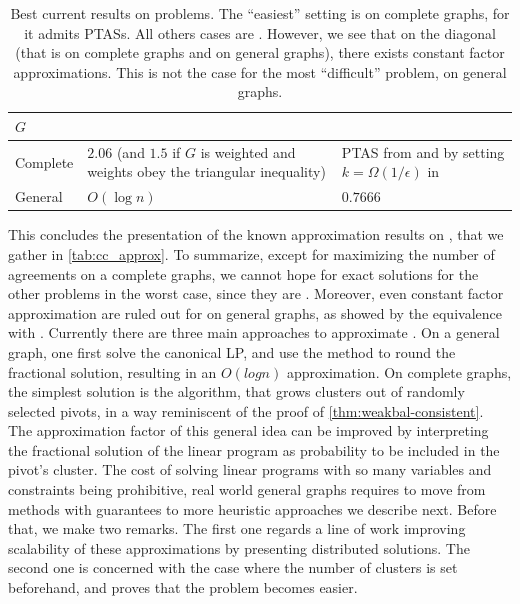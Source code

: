 \begin{table}
   \caption{Best current results on \pcc{} problems. The \enquote{easiest} setting is \maxa{} on
      complete graphs, for it admits PTASs. All others cases are \APXh{}. However, we see that on
      the diagonal (that is \mind{} on complete graphs and \maxa{} on general graphs), there exists
      constant factor approximations. This is not the case for the most \enquote{difficult} problem,
      \mind{} on general graphs. \label{tab:cc_approx}}
   \begin{tabulary}{\textwidth}{lLL}
      \toprule
      $G$      &  \mind{}                                                  & \maxa{}                                 \\
      \midrule
      Complete &  $2.06$ (and $1.5$ if $G$ is weighted and weights obey the triangular inequality) \autocite{Chawla2014}
               & PTAS from \textcite{Bansal2002} and by setting $k=\Omega(1/\epsilon)$ in \autocite{Giotis2006}      \\
      General  &  $O(\log n)$ \autocite{Charikar2003}                      & $0.7666$ \autocite{Swamy2004}           \\
      \bottomrule
   \end{tabulary}
\end{table}

\medskip

This concludes the presentation of the known approximation results on \pcc{}, that we gather in
\autoref{tab:cc_approx}.
To summarize, except for maximizing the number of agreements on a complete graphs, we cannot hope
for exact solutions for the other problems in the worst case, since they are \APXh{}. Moreover, even
constant factor approximation are ruled out for \mind{} on general graphs, as showed by the
equivalence with \mmc{}.
Currently there are three main approaches to approximate \mind{}. On a general graph,
one first solve the canonical LP, and use the \regionGrow{} method to round the fractional solution,
resulting in an $O(log n)$ approximation. On complete graphs, the simplest solution is the
\ccpivot{} algorithm, that grows clusters out of randomly selected pivots, in a way reminiscent of
the proof of \autoref{thm:weakbal-consistent}. The approximation factor of this general idea can be
improved by interpreting the fractional solution of the linear program as probability to be included
in the pivot's cluster. The cost of solving linear programs with so many variables and constraints
being prohibitive, real world general graphs requires to move from methods with guarantees to more
heuristic approaches we describe next. Before that, we make two remarks. The first one regards a
line of work improving scalability of these approximations by presenting distributed solutions. The
second one is concerned with the case where the number of clusters is set beforehand, and proves
that the problem becomes easier.

